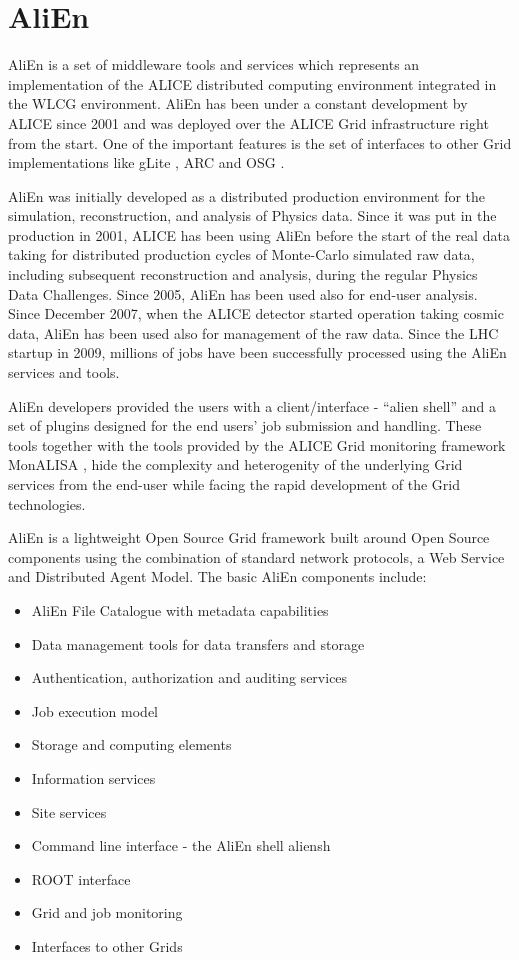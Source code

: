 \section{AliEn}

AliEn \cite{AliEn} is a set of middleware tools and services which represents
an implementation of the ALICE distributed computing environment
integrated in the WLCG environment. AliEn has been under a constant
development by ALICE since 2001 and was deployed over the
ALICE Grid infrastructure right from the start. One of the important
features is the set of interfaces to other Grid implementations like
gLite \cite{glite}, ARC \cite{arc} and OSG \cite{OSG}.

AliEn was initially developed as a distributed production
environment for the simulation, reconstruction, and analysis of
Physics data. Since it was put in the production in 2001, ALICE has
been using AliEn before the start of  the real data taking for
distributed production cycles of Monte-Carlo simulated raw data,
including subsequent reconstruction and analysis, during the regular
Physics Data Challenges. Since 2005, AliEn has been used also for
end-user analysis.  Since December 2007, when the ALICE detector
started operation taking cosmic data, AliEn has been used also for
management of the raw data.  Since the LHC startup in 2009, millions
of jobs have been successfully processed using the AliEn services
and tools.

AliEn developers provided the users with a client/interface - ``alien
shell'' \cite{alienshell} and a set of plugins designed for the end users' job
submission and handling. These tools together with the tools
provided by the ALICE Grid monitoring framework MonALISA \cite{MonALISA}, hide
the complexity and heterogenity of the underlying Grid services from
the end-user while facing the rapid development of the Grid
technologies.

AliEn is a lightweight Open Source Grid framework built around Open
Source components using the combination of standard network
protocols, a Web Service and Distributed Agent Model. The basic
AliEn components include:
%
\begin{itemize}
\item AliEn File Catalogue with metadata capabilities
\item  Data management tools for data transfers and storage
\item Authentication, authorization and auditing services
\item Job execution model
\item Storage and computing elements
\item Information services
\item Site services
\item Command line interface - the AliEn shell aliensh
\item ROOT interface
\item Grid and job monitoring
\item Interfaces to other Grids
\end{itemize}

